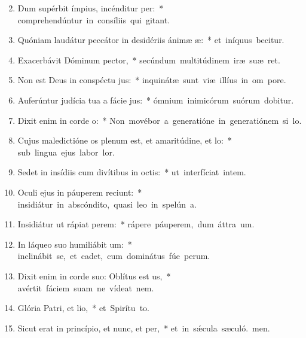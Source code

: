 \begin{flushleft}
\begin{enumerate}[leftmargin=*]
\setcounter{enumi}{1}

\item Dum supérbit ímpius, incénditur per:~* \mbox{comprehendúntur in consíliis qui gitant.}

\item Quóniam laudátur peccátor in desidériis ánimæ æ:~* \mbox{et iníquus becitur.}

\item Exacerbávit Dóminum pector,~* \mbox{secúndum multitúdinem iræ suæ  ret.}

\item Non est Deus in conspéctu jus:~* \mbox{inquinátæ sunt viæ illíus in om pore.}

\item Auferúntur judícia tua a fácie jus:~* \mbox{ómnium inimicórum suórum dobitur.}

\item Dixit enim in corde o:~* \mbox{Non movébor a generatióne in generatiónem si lo.}

\item Cujus maledictióne os plenum est, et amaritúdine, et lo:~* \mbox{sub lingua ejus labor  lor.}

\item Sedet in insídiis cum divítibus in octis:~* \mbox{ut interfíciat intem.}

\item Oculi ejus in páuperem reciunt:~* \mbox{insidiátur in abscóndito, quasi leo in spelún a.}

\item Insidiátur ut rápiat perem:~* \mbox{rápere páuperem, dum áttra um.}

\item In láqueo suo humiliábit um:~* \mbox{inclinábit se, et cadet, cum dominátus fúe perum.}

\item Dixit enim in corde suo: Oblítus est us,~* \mbox{avértit fáciem suam ne vídeat  nem.}

\item Glória Patri, et lio,~* \mbox{et Spirítu to.}

\item Sicut erat in princípio, et nunc, et per,~* \mbox{et in s\'{\ae}cula sæculó. men.}

\end{enumerate}
\end{flushleft}


